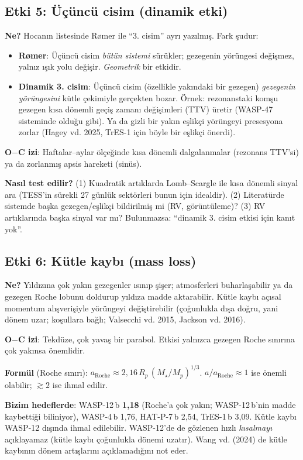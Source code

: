 \subsection{Etki 5: Üçüncü cisim (dinamik etki)}
\textbf{Ne?} Hocanın listesinde Rømer ile “3. cisim” ayrı yazılmış. Fark şudur:
\begin{itemize}[leftmargin=*]
\item \textbf{Rømer}: Üçüncü cisim \emph{bütün sistemi} sürükler; gezegenin yörüngesi değişmez, yalnız ışık yolu değişir.
      \emph{Geometrik} bir etkidir.
\item \textbf{Dinamik 3. cisim}: Üçüncü cisim (özellikle yakındaki bir gezegen) \emph{gezegenin yörüngesini} kütle
      çekimiyle gerçekten bozar. Örnek: rezonanstaki komşu gezegen kısa dönemli geçiş zamanı değişimleri (TTV)
      üretir (WASP-47 sisteminde olduğu gibi). Ya da gizli bir yakın eşlikçi yörüngeyi presesyona zorlar
      (Hagey vd. 2025, TrES-1 için böyle bir eşlikçi önerdi).
\end{itemize}
\textbf{O$-$C izi}: Haftalar–aylar ölçeğinde kısa dönemli dalgalanmalar (rezonans TTV'si) ya da zorlanmış apsis
hareketi (sinüs).

\textbf{Nasıl test edilir?} (1) Kuadratik artıklarda Lomb–Scargle ile kısa dönemli sinyal ara (TESS'in sürekli 27 günlük
sektörleri bunun için idealdir). (2) Literatürde sistemde başka gezegen/eşlikçi bildirilmiş mi (RV, görüntüleme)?
(3) RV artıklarında başka sinyal var mı? Bulunmazsa: “dinamik 3. cisim etkisi için kanıt yok”.

\subsection{Etki 6: Kütle kaybı (mass loss)}
\textbf{Ne?} Yıldızına çok yakın gezegenler ısınıp şişer; atmosferleri buharlaşabilir ya da gezegen Roche lobunu
doldurup yıldıza madde aktarabilir. Kütle kaybı açısal momentum alışverişiyle yörüngeyi değiştirebilir (çoğunlukla
dışa doğru, yani dönem uzar; koşullara bağlı; Valsecchi vd. 2015, Jackson vd. 2016).

\textbf{O$-$C izi}: Tekdüze, çok yavaş bir parabol. Etkisi yalnızca gezegen Roche sınırına çok yakınsa önemlidir.

\textbf{Formül} (Roche sınırı): $a_\text{Roche} \approx 2{,}16\,R_p\,(M_\star/M_p)^{1/3}$.
$a/a_\text{Roche} \approx 1$ ise önemli olabilir; $\gtrsim 2$ ise ihmal edilir.

\textbf{Bizim hedeflerde}: WASP-12\,b \textbf{1,18} (Roche'a çok yakın; WASP-12\,b'nin madde kaybettiği biliniyor),
WASP-4\,b 1,76, HAT-P-7\,b 2,54, TrES-1\,b 3,09. Kütle kaybı WASP-12 dışında ihmal edilebilir. WASP-12'de de gözlenen
hızlı \emph{kısalmayı} açıklayamaz (kütle kaybı çoğunlukla dönemi uzatır). Wang vd. (2024) de kütle kaybının dönem
artışlarını açıklamadığını not eder.


